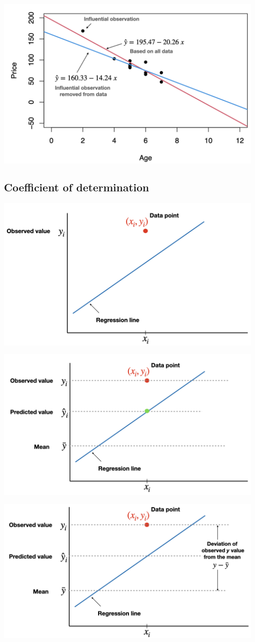 \documentclass[
]{article}
\begin{document}
\begin{center}\includegraphics[width=0.6\linewidth,height=0.6\textheight]{figures/outliersreg} \end{center}

\hypertarget{coefficient-of-determination}{%
\subsection{Coefficient of
determination}\label{coefficient-of-determination}}

\begin{center}\includegraphics[width=0.6\linewidth,height=0.6\textheight]{figures/cod1} \end{center}

\begin{center}\includegraphics[width=0.6\linewidth,height=0.6\textheight]{figures/cod2} \end{center}

\begin{center}\includegraphics[width=0.6\linewidth,height=0.6\textheight]{figures/cod3} \end{center}
\end{document}
